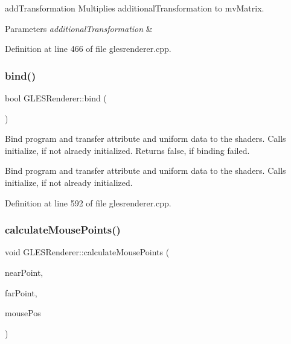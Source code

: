 add\+Transformation Multiplies additional\+Transformation to mv\+Matrix. 


\begin{DoxyParams}{Parameters}
{\em additional\+Transformation} & \\
\hline
\end{DoxyParams}


Definition at line 466 of file glesrenderer.\+cpp.

\mbox{\label{class_g_l_e_s_renderer_a41d040c7fa439552abf339b3883b02f4}} 
\subsubsection{\texorpdfstring{bind()}{bind()}}
{\footnotesize\ttfamily bool G\+L\+E\+S\+Renderer\+::bind (\begin{DoxyParamCaption}{ }\end{DoxyParamCaption})\hspace{0.3cm}{\ttfamily [virtual]}}

Bind program and transfer attribute and uniform data to the shaders. Calls initialize, if not alraedy initialized. Returns false, if binding failed.

Bind program and transfer attribute and uniform data to the shaders. Calls initialize, if not already initialized. 

Definition at line 592 of file glesrenderer.\+cpp.

\mbox{\label{class_g_l_e_s_renderer_ae600d289f94594374cdbd8c031cb0c86}} 
\subsubsection{\texorpdfstring{calculateMousePoints()}{calculateMousePoints()}}
{\footnotesize\ttfamily void G\+L\+E\+S\+Renderer\+::calculate\+Mouse\+Points (\begin{DoxyParamCaption}\item[{Q\+Vector3D $\ast$}]{near\+Point,  }\item[{Q\+Vector3D $\ast$}]{far\+Point,  }\item[{const Q\+Point \&}]{mouse\+Pos }\end{DoxyParamCaption})}


